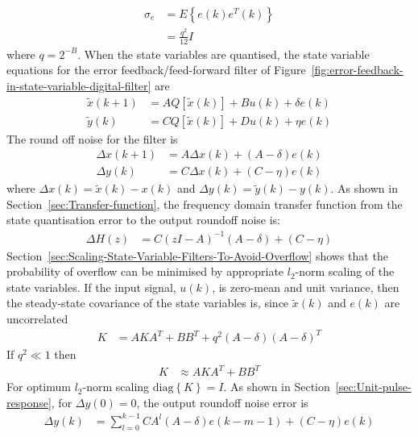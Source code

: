 \documentclass[a4paper,twoside,10pt,english]{report}
\begin{document}
\begin{align*}
\sigma_{e}&=E\left\{e\left(k\right)e^{T}\left(k\right)\right\}\\
&=\frac{q^{2}}{12}I
\end{align*}
where $q=2^{-B}$. When the state variables are quantised, the 
state variable equations for the error feedback/feed-forward filter of
Figure~\ref{fig:error-feedback-in-state-variable-digital-filter} are
\begin{align*}
\tilde{x}\left(k+1\right) &=
AQ\left[\tilde{x}\left(k\right)\right] + Bu\left(k\right) + 
\delta e\left(k\right) \\
\tilde{y}\left(k\right) &= CQ\left[\tilde{x}\left(k\right)\right] +
Du\left(k\right) + \eta e\left(k\right)
\end{align*}
The round off noise for the filter is
\begin{align*}
\Delta x\left(k+1\right) &= A\Delta x\left(k\right) + 
\left(A-\delta\right)e\left(k\right) \\
\Delta y\left(k\right) &= C\Delta x\left(k\right) + 
\left(C-\eta\right)e\left(k\right)
\end{align*}
where $\Delta x\left(k\right)= \tilde{x}\left(k\right)-x\left(k\right)$ and
$\Delta y\left(k\right)= \tilde{y}\left(k\right)-y\left(k\right)$. As shown in
Section~\ref{sec:Transfer-function}, the frequency domain transfer function
from the state quantisation error to the output roundoff noise is:
\begin{align*}
\Delta H\left(z\right) &= C\left(zI-A\right)^{-1}\left(A-\delta\right) + 
\left(C-\eta\right)
\end{align*}
Section~\ref{sec:Scaling-State-Variable-Filters-To-Avoid-Overflow} shows that
the probability of overflow can be minimised by appropriate $l_{2}$-norm scaling
of the state variables. If the input signal, $u\left(k\right)$, is zero-mean and
unit variance, then the steady-state covariance of the state variables is,
since $\tilde{x}\left(k\right)$ and $e\left(k\right)$
are uncorrelated
\begin{align*}
K&=AKA^{T} +BB^{T}+q^{2}\left(A-\delta\right)\left(A-\delta\right)^{T}
\end{align*}
If $q^{2}\ll 1$ then
\begin{align*}
K&\approx AKA^{T} + BB^{T}
\end{align*}
For optimum $l_{2}$-norm scaling $\text{diag}\left\{K\right\}=I$.
As shown in Section~\ref{sec:Unit-pulse-response}, for 
$\Delta y\left(0\right)=0$, the output roundoff noise error is
\begin{align*}
\Delta y\left(k\right)&=
\sum_{l=0}^{k-1}CA^{l}\left(A-\delta\right)e\left(k-m-1\right)
+ \left(C-\eta\right)e\left(k\right)
\end{align*}
\end{document}
